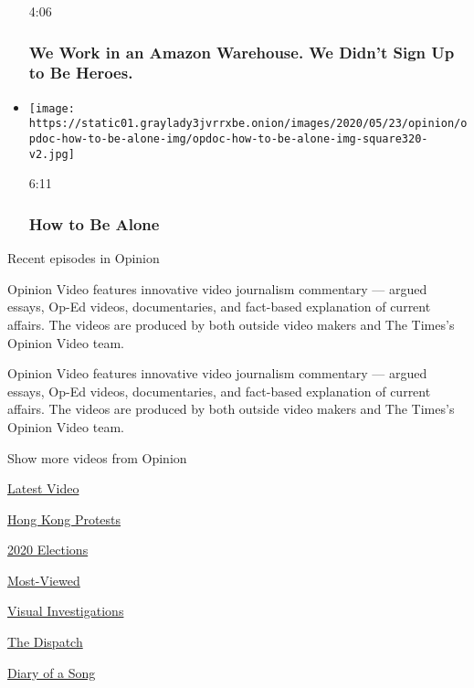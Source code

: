 \begin{itemize}
  4:06

  \hypertarget{we-work-in-an-amazon-warehouse-we-didnt-sign-up-to-be-heroes}{%
  \subsubsection{We Work in an Amazon Warehouse. We Didn't Sign Up to Be
  Heroes.}\label{we-work-in-an-amazon-warehouse-we-didnt-sign-up-to-be-heroes}}
\item
  \href{https://www.nytimes3xbfgragh.onion/video/opinion/100000007139379/how-to-be-alone.html?action=click\&module=video-series-bar\&region=header\&pgtype=Article\&playlistId=video/opinion}{}

  \texttt{[image: https://static01.graylady3jvrrxbe.onion/images/2020/05/23/opinion/opdoc-how-to-be-alone-img/opdoc-how-to-be-alone-img-square320-v2.jpg]}

  6:11

  \hypertarget{how-to-be-alone}{%
  \subsubsection{How to Be Alone}\label{how-to-be-alone}}
\end{itemize}

Recent episodes in Opinion

Opinion Video features innovative video journalism commentary --- argued
essays, Op-Ed videos, documentaries, and fact-based explanation of
current affairs. The videos are produced by both outside video makers
and The Times's Opinion Video team.

Opinion Video features innovative video journalism commentary --- argued
essays, Op-Ed videos, documentaries, and fact-based explanation of
current affairs. The videos are produced by both outside video makers
and The Times's Opinion Video team.

Show more videos from Opinion

\href{/video}{}

\href{/video/latest-video}{Latest Video}

\href{/video/hk-protest}{Hong Kong Protests}

\href{/video/2020-Elections}{2020 Elections}

\href{/video/Most-Viewed}{Most-Viewed}

\href{/video/investigations}{Visual Investigations}

\href{/video/on-the-ground}{The Dispatch}

\href{/video/diaryofasong}{Diary of a Song}


